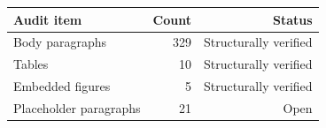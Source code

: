 \begin{tabular}{lrr}
\hline
Audit item & Count & Status \\
\hline
Body paragraphs & 329 & Structurally verified \\
Tables & 10 & Structurally verified \\
Embedded figures & 5 & Structurally verified \\
Placeholder paragraphs & 21 & Open \\
\hline
\end{tabular}
